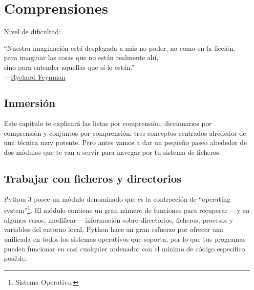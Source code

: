 
\chapter{Comprensiones}\label{ch:comprensiones}

\noindent
Nivel de dificultad:\difll

\begin{citaCap}
``Nuestra imaginación está desplegada a más no poder, 
no como en la ficción, para imaginar las cosas que no están realmente ahí,\\
sino para entender aquellas que sí lo están.''\\
---\href{http://en.wikiquote.org/wiki/Richard\_Feynman}{Rychard Feynman}
\end{citaCap}

\section{Inmersión}

Este capítulo te explicará las listas por comprensión, diccionarios por comprensión y conjuntos por comprensión: tres conceptos centrados alrededor de una técnica muy potente. Pero antes vamos a dar un pequeño paseo alrededor de dos módulos que te van a servir para navegar por tu sistema de ficheros.

\section{Trabajar con ficheros y directorios}

Python 3 posee un módulo denominado  que es la contracción de ``operating system''\footnote{Sistema Operativo.}. El módulo \href{http://docs.python.org/3.1/library/os.html}{} contiene un gran número de funciones para recuperar ---y en algunos casos, modificar--- información sobre directorios, ficheros, procesos y variables del entorno local. Python hace un gran esfuerzo por ofrecer una  unificada en todos los sistemas operativos que soporta, por lo que tus programas pueden funcionar en casi cualquier ordenador con el mínimo de código específico posible.

